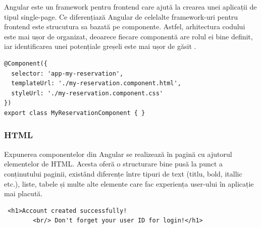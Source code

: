 \hspace{0cm} Angular este un framework pentru frontend care ajută la crearea unei aplicații de tipul single-page. Ce diferențiază Angular de celelalte framework-uri pentru frontend este strucutura sa bazată pe componente. Astfel, arhitectura codului este mai ușor de organizat, deoarece fiecare componentă are rolul ei bine definit, iar identificarea unei potențiale greșeli este mai ușor de găsit \cite{citation5}.

\begin{center}
\begin{minipage}{0.8\textwidth}
\captionsetup{type=listing}
   \begin{lstlisting}
@Component({
  selector: 'app-my-reservation',
  templateUrl: './my-reservation.component.html',
  styleUrl: './my-reservation.component.css'
})
export class MyReservationComponent { }
\end{lstlisting} 
\end{minipage}
\end{center}


\vspace{0.5em}


\begin{minipage}{\textwidth}
\hfill
\begin{minipage}{0.9\textwidth}
\subsubsection{HTML}
\end{minipage}
\end{minipage}

\hspace{0cm} Expunerea componentelor din Angular se realizează în pagină cu ajutorul elementelor de HTML. Acesta oferă o structurare bine pusă la punct a conținutului paginii, existând diferențe între tipuri de text (titlu, bold, itallic etc.), liste, tabele și multe alte elemente care fac experiența user-ului în aplicație mai placută. 

\begin{center}
\begin{minipage}{0.8\textwidth}
\captionsetup{type=listing}
   \begin{lstlisting}
 <h1>Account created successfully!
        <br/> Don't forget your user ID for login!</h1>
\end{lstlisting} 
\end{minipage}
\end{center}

